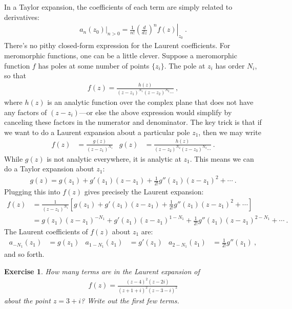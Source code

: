 \documentclass[
  11pt,
	colorful,
	raggedright,
]{tufte-style-thesis-flip}
\newtheorem{exercise}{Exercise}[section]
\begin{document}
In a Taylor expansion, the coefficients of each term are simply related to derivatives:
\begin{align}
  \left.a_n(z_0)\right|_{n>0}
  = 
  \frac{1}{n!}\left.\left(\frac{d}{dz}\right)^n f(z)\right|_{z_0} \ .
\end{align}
There's no pithy closed-form expression for the Laurent coefficients. For meromorphic functions, one can be a little clever. Suppose a meromorphic function $f$ has poles at some number of points $\{z_i\}$. The pole at $z_i$ has order $N_i$, so that
\begin{align}
  f(z) = \frac{h(z)}{(z-z_1)^{N_1}(z-z_2)^{N_2}\cdots} \ ,
\end{align}
where $h(z)$ is an analytic function over the complex plane that does not have any factors of $(z-z_i)$---or else the above expression would simplify by canceling these factors in the numerator and denominator. The key trick is that if we want to do a Laurent expansion about a particular pole $z_1$, then we may write
\begin{align}
  f(z) &= \frac{g(z)}{(z-z_1)^{N_1}}
  &
  g(z) &= \frac{h(z)}{(z-z_2)^{N_2}(z-z_3)^{N_3}\cdots} \ .
\end{align}
While $g(z)$ is not analytic everywhere, it {is analytic} at $z_1$. This means we can do a Taylor expansion about $z_1$:
\begin{align}
  g(z) = g(z_1) + g'(z_1)(z-z_1) + \frac{1}{2!}g''(z_1)(z-z_1)^2 + \cdots \ .
\end{align}
Plugging this into $f(z)$ gives precisely the Laurent expansion:
\begin{align}
  f(z) &= \frac{1}{(z-z_1)^{N_1}}
  \left[
  g(z_1) + g'(z_1)(z-z_1) + \frac{1}{2!}g''(z_1)(z-z_1)^2 + \cdots
  \right]
  \\
  &=
  g(z_1)(z-z_1)^{-N_1} 
  + g'(z_1)(z-z_1)^{1-N_1} 
  + \frac{1}{2!}g''(z_1)(z-z_1)^{2-N_1} + \cdots \ .
\end{align}
The Laurent coefficients of $f(z)$ about $z_1$ are:
\begin{align}
  a_{-N_1}(z_1) &= g(z_1)
  &
  a_{1-N_1}(z_1) &= g'(z_1)
  &
  a_{2-N_1}(z_1) &= \frac{1}{2!}g''(z_1) \ ,
\end{align}
and so forth.

\begin{exercise}
How many terms are in the Laurent expansion of
\begin{align}
  f(z) = \frac{(z-4)^2(z-2i)}{(z+1+i)^2(z-3-i)^2} 
\end{align}
about the point $z = 3+i$? Write out the first few terms.
\end{exercise}
\end{document}
